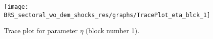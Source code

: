 \begin{figure}[H]
\centering
  \texttt{[image: BRS\_sectoral\_wo\_dem\_shocks\_res/graphs/TracePlot\_eta\_blck\_1]}\\
    \caption{Trace plot for parameter ${\eta}$ (block number 1).}
\end{figure}
